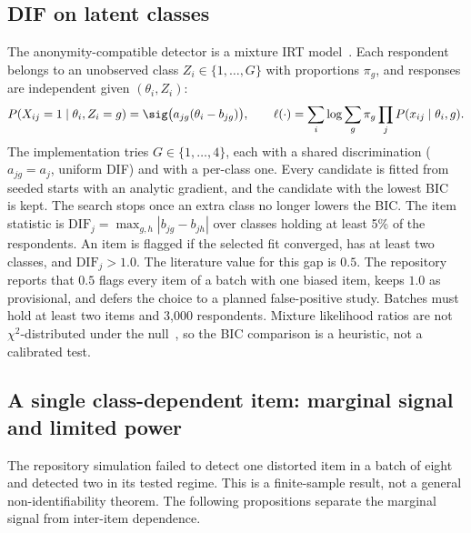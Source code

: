 \subsection{DIF on latent classes}

The anonymity-compatible detector is a mixture IRT model~\cite{rost1990,cohen2005mixture}. Each
respondent belongs to an unobserved class $Z_i\in\{1,\dots,G\}$ with proportions $\pi_g$, and
responses are independent given $(\theta_i,Z_i)$:
\begin{equation}\label{eq:mixture}
  P(X_{ij}=1\mid\theta_i,Z_i=g)=\sig\bigl(a_{jg}(\theta_i-b_{jg})\bigr),\qquad
  \ell(\cdot)=\sum_i\log\sum_g\pi_g\prod_j P(x_{ij}\mid\theta_i,g).
\end{equation}
The implementation tries $G\in\{1,\dots,4\}$, each with a shared discrimination
($a_{jg}=a_j$, uniform DIF) and with a per-class one. Every candidate is fitted from seeded
starts with an analytic gradient, and the candidate with the lowest
BIC~\cite{schwarz1978} is kept. The search stops once an extra class no longer lowers the BIC.
The item statistic is $\mathrm{DIF}_j=\max_{g,h}|b_{jg}-b_{jh}|$ over classes holding at least 5\%
of the respondents. An item is flagged if the selected fit converged, has at least two classes,
and $\mathrm{DIF}_j>1.0$. The literature value for this gap is $0.5$. The repository reports
that $0.5$ flags every item of a batch with one biased item, keeps $1.0$ as provisional, and
defers the choice to a planned false-positive study. Batches must hold at least two items and
3{,}000 respondents. Mixture likelihood ratios are not $\chi^2$-distributed under the
null~\cite{self1987,mclachlan2000}, so the BIC comparison is a heuristic, not a calibrated test.

\subsection{A single class-dependent item: marginal signal and limited power}

The repository simulation failed to detect one distorted item in a batch of eight and detected
two in its tested regime. This is a finite-sample result, not a general non-identifiability
theorem. The following propositions separate the marginal signal from inter-item dependence.

